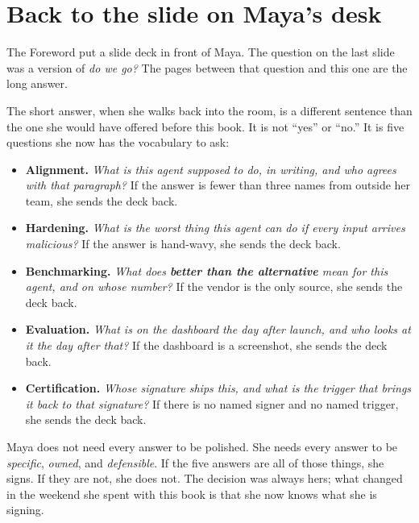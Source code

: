 \section{Back to the slide on Maya's desk}

The Foreword put a slide deck in front of Maya. The question on the last slide was a version of \textit{do we go?} The pages between that question and this one are the long answer.

The short answer, when she walks back into the room, is a different sentence than the one she would have offered before this book. It is not ``yes'' or ``no.'' It is five questions she now has the vocabulary to ask:

\begin{itemize}
\item \textbf{Alignment.} \textit{What is this agent supposed to do, in writing, and who agrees with that paragraph?} If the answer is fewer than three names from outside her team, she sends the deck back.
\item \textbf{Hardening.} \textit{What is the worst thing this agent can do if every input arrives malicious?} If the answer is hand-wavy, she sends the deck back.
\item \textbf{Benchmarking.} \textit{What does \textbf{better than the alternative} mean for this agent, and on whose number?} If the vendor is the only source, she sends the deck back.
\item \textbf{Evaluation.} \textit{What is on the dashboard the day after launch, and who looks at it the day after that?} If the dashboard is a screenshot, she sends the deck back.
\item \textbf{Certification.} \textit{Whose signature ships this, and what is the trigger that brings it back to that signature?} If there is no named signer and no named trigger, she sends the deck back.
\end{itemize}

Maya does not need every answer to be polished. She needs every answer to be \textit{specific}, \textit{owned}, and \textit{defensible}. If the five answers are all of those things, she signs. If they are not, she does not. The decision was always hers; what changed in the weekend she spent with this book is that she now knows what she is signing.

\TNrule

\stoptwocol

